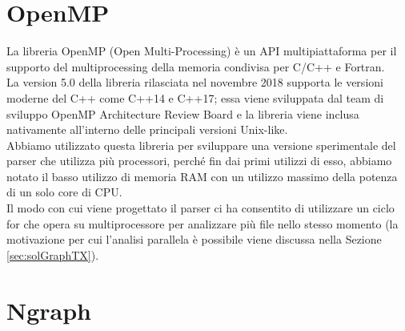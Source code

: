 \section{OpenMP} \label{sec:openmp}

La libreria OpenMP (Open Multi-Processing) \cite{dagum1998openmp} è un API multipiattaforma per il supporto del multiprocessing della memoria condivisa per C/C++ e Fortran.\\
La version 5.0 della libreria rilasciata nel novembre 2018 supporta le versioni moderne del C++ come C++14 e C++17; essa viene sviluppata dal team di sviluppo OpenMP Architecture Review Board e la libreria viene inclusa nativamente all'interno delle principali versioni Unix-like.\\
Abbiamo utilizzato questa libreria per sviluppare una versione sperimentale del parser che utilizza più processori, perché fin dai primi utilizzi di esso, abbiamo notato il basso utilizzo di memoria RAM con un utilizzo massimo della potenza di un solo core di CPU.\\
Il modo con cui viene progettato il parser ci ha consentito di utilizzare un ciclo for che opera su multiprocessore per analizzare più file nello stesso momento (la motivazione per cui l'analisi parallela è possibile viene discussa nella Sezione \ref{sec:solGraphTX}).

\section{Ngraph} \label{sec:ngraph}

